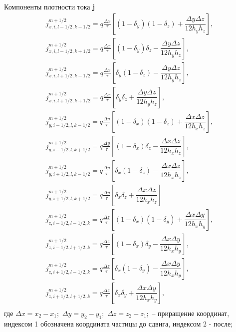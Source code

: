 Компоненты плотности тока \textbf{j}
\begin{equation}
\begin{array}{c}
j_{x,i,l-1/2,k-1/2}^{m+1/2}=q\frac{\Delta x}{\tau}\left[(1-\delta_{y})(1-\delta_{z})+\dfrac{\Delta y \Delta z}{12 h_{y}h_{z}}
\right], \\
j_{x,i,l-1/2,k+1/2}^{m+1/2}=q\frac{\Delta x}{\tau}\left[(1-\delta_{y})\delta_{z}-\dfrac{\Delta y \Delta z}{12 h_{y}h_{z}}
\right], \\
j_{x,i,l+1/2,k-1/2}^{m+1/2}=q\frac{\Delta x}{\tau}\left[\delta_{y}(1-\delta_{z})-\dfrac{\Delta y \Delta z}{12 h_{y}h_{z}}
\right], \\
j_{x,i,l+1/2,k+1/2}^{m+1/2}=q\frac{\Delta x}{\tau}\left[\delta_{y}\delta_{z}+\dfrac{\Delta y \Delta z}{12 h_{y}h_{z}}
\right], \\
j_{y,i-1/2,l,k-1/2}^{m+1/2}=q\frac{\Delta y}{\tau}\left[(1-\delta_{x})(1-\delta_{z})+\dfrac{\Delta x \Delta z}{12 h_{x}h_{z}}
\right], \\
j_{y,i-1/2,l,k+1/2}^{m+1/2}=q\frac{\Delta y}{\tau}\left[(1-\delta_{x})\delta_{z}-\dfrac{\Delta x \Delta z}{12 h_{x}h_{z}}
\right], \\
j_{y,i+1/2,l,k-1/2}^{m+1/2}=q\frac{\Delta y}{\tau}\left[\delta_{x}(1-\delta_{z})-\dfrac{\Delta x \Delta z}{12 h_{x}h_{z}}
\right], \\
j_{y,i+1/2,l,k+1/2}^{m+1/2}=q\frac{\Delta y}{\tau}\left[\delta_{x}\delta_{z}+\dfrac{\Delta x \Delta z}{12 h_{x}h_{z}}
\right] \\
j_{z,i-1/2,l-1/2,k}^{m+1/2}=q\frac{\Delta z}{\tau}\left[(1-\delta_{x})(1-\delta_{y})+\dfrac{\Delta x \Delta y}{12 h_{x}h_{y}}
\right], \\
j_{z,i-1/2,l+1/2,k}^{m+1/2}=q\frac{\Delta z}{\tau}\left[(1-\delta_{x})\delta_{y}-\dfrac{\Delta x \Delta y}{12 h_{x}h_{y}}
\right], \\
j_{z,i+1/2,l-1/2,k}^{m+1/2}=q\frac{\Delta z}{\tau}\left[\delta_{x}(1-\delta_{y})-\dfrac{\Delta x \Delta y}{12 h_{x}h_{y}}
\right], \\
j_{z,i+1/2,l+1/2,k}^{m+1/2}=q\frac{\Delta z}{\tau}\left[\delta_{x}\delta_{y}+\dfrac{\Delta x \Delta y}{12 h_{x}h_{y}}
\right], \\
\end{array}
\end{equation}
где $\Delta x=x_2-x_1;$ $\Delta y=y_2-y_1;$ $\Delta z=z_2-z_1;$ -- приращение координат, индексом 1 обозначена координата частицы до сдвига, индексом 2 - после; 


